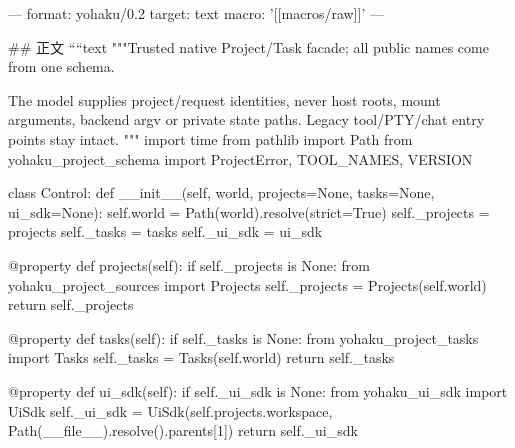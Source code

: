 ---
format: yohaku/0.2
target: text
macro: '[[macros/raw]]'
---

## 正文
````text
"""Trusted native Project/Task facade; all public names come from one schema.

The model supplies project/request identities, never host roots, mount arguments,
backend argv or private state paths. Legacy tool/PTY/chat entry points stay intact.
"""
import time
from pathlib import Path
from yohaku_project_schema import ProjectError, TOOL_NAMES, VERSION


class Control:
    def __init__(self, world, projects=None, tasks=None, ui_sdk=None):
        self.world = Path(world).resolve(strict=True)
        self._projects = projects
        self._tasks = tasks
        self._ui_sdk = ui_sdk

    @property
    def projects(self):
        if self._projects is None:
            from yohaku_project_sources import Projects
            self._projects = Projects(self.world)
        return self._projects

    @property
    def tasks(self):
        if self._tasks is None:
            from yohaku_project_tasks import Tasks
            self._tasks = Tasks(self.world)
        return self._tasks

    @property
    def ui_sdk(self):
        if self._ui_sdk is None:
            from yohaku_ui_sdk import UiSdk
            self._ui_sdk = UiSdk(self.projects.workspace, Path(__file__).resolve().parents[1])
        return self._ui_sdk

